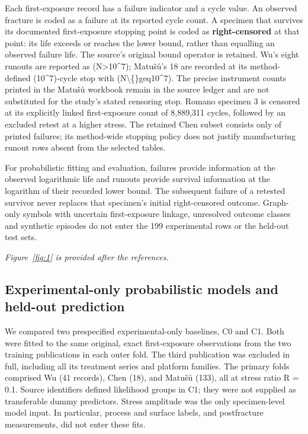 \documentclass[12pt,a4paper]{article}
\begin{document}
Each first-exposure record has a failure indicator and a cycle value. An observed fracture is coded as a failure at its reported cycle count. A specimen that survives its documented first-exposure stopping point is coded as \textbf{right-censored} at that point: its life exceeds or reaches the lower bound, rather than equalling an observed failure life. The source’s original bound operator is retained. Wu’s eight runouts are reported as (N>10\textasciicircum{}7); Matušů’s 18 are recorded at its method-defined (10\textasciicircum{}7)-cycle stop with (N\textbackslash\{\}geq10\textasciicircum{}7). The precise instrument counts printed in the Matušů workbook remain in the source ledger and are not substituted for the study’s stated censoring stop. Romano specimen 3 is censored at its explicitly linked first-exposure count of 8,889,311 cycles, followed by an excluded retest at a higher stress. The retained Chen subset consists only of printed failures; its method-wide stopping policy does not justify manufacturing runout rows absent from the selected tables.

For probabilistic fitting and evaluation, failures provide information at the observed logarithmic life and runouts provide survival information at the logarithm of their recorded lower bound. The subsequent failure of a retested survivor never replaces that specimen’s initial right-censored outcome. Graph-only symbols with uncertain first-exposure linkage, unresolved outcome classes and synthetic episodes do not enter the 199 experimental rows or the held-out test sets.


\noindent\textit{Figure~\ref{fig:1} is provided after the references.}\par


\subsection{Experimental-only probabilistic models and held-out prediction}

We compared two prespecified experimental-only baselines, C0 and C1. Both were fitted to the same original, exact first-exposure observations from the two training publications in each outer fold. The third publication was excluded in full, including all its treatment series and platform families. The primary folds comprised Wu (41 records), Chen (18), and Matušů (133), all at stress ratio R = 0.1. Source identifiers defined likelihood groups in C1; they were not supplied as transferable dummy predictors. Stress amplitude was the only specimen-level model input. In particular, process and surface labels, and postfracture measurements, did not enter these fits.
\end{document}
